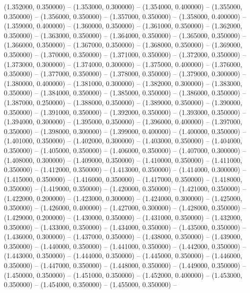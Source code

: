 (1.352000, 0.350000) -- 
(1.353000, 0.300000) -- 
(1.354000, 0.400000) -- 
(1.355000, 0.350000) -- 
(1.356000, 0.350000) -- 
(1.357000, 0.350000) -- 
(1.358000, 0.400000) -- 
(1.359000, 0.400000) -- 
(1.360000, 0.350000) -- 
(1.361000, 0.350000) -- 
(1.362000, 0.350000) -- 
(1.363000, 0.350000) -- 
(1.364000, 0.350000) -- 
(1.365000, 0.350000) -- 
(1.366000, 0.350000) -- 
(1.367000, 0.350000) -- 
(1.368000, 0.350000) -- 
(1.369000, 0.350000) -- 
(1.370000, 0.350000) -- 
(1.371000, 0.350000) -- 
(1.372000, 0.350000) -- 
(1.373000, 0.300000) -- 
(1.374000, 0.300000) -- 
(1.375000, 0.400000) -- 
(1.376000, 0.350000) -- 
(1.377000, 0.350000) -- 
(1.378000, 0.350000) -- 
(1.379000, 0.300000) -- 
(1.380000, 0.400000) -- 
(1.381000, 0.300000) -- 
(1.382000, 0.300000) -- 
(1.383000, 0.350000) -- 
(1.384000, 0.350000) -- 
(1.385000, 0.350000) -- 
(1.386000, 0.350000) -- 
(1.387000, 0.250000) -- 
(1.388000, 0.350000) -- 
(1.389000, 0.350000) -- 
(1.390000, 0.350000) -- 
(1.391000, 0.350000) -- 
(1.392000, 0.350000) -- 
(1.393000, 0.350000) -- 
(1.394000, 0.300000) -- 
(1.395000, 0.350000) -- 
(1.396000, 0.400000) -- 
(1.397000, 0.350000) -- 
(1.398000, 0.300000) -- 
(1.399000, 0.400000) -- 
(1.400000, 0.350000) -- 
(1.401000, 0.350000) -- 
(1.402000, 0.300000) -- 
(1.403000, 0.350000) -- 
(1.404000, 0.350000) -- 
(1.405000, 0.350000) -- 
(1.406000, 0.350000) -- 
(1.407000, 0.300000) -- 
(1.408000, 0.300000) -- 
(1.409000, 0.350000) -- 
(1.410000, 0.350000) -- 
(1.411000, 0.350000) -- 
(1.412000, 0.350000) -- 
(1.413000, 0.350000) -- 
(1.414000, 0.300000) -- 
(1.415000, 0.350000) -- 
(1.416000, 0.350000) -- 
(1.417000, 0.350000) -- 
(1.418000, 0.350000) -- 
(1.419000, 0.350000) -- 
(1.420000, 0.350000) -- 
(1.421000, 0.350000) -- 
(1.422000, 0.200000) -- 
(1.423000, 0.300000) -- 
(1.424000, 0.300000) -- 
(1.425000, 0.350000) -- 
(1.426000, 0.400000) -- 
(1.427000, 0.300000) -- 
(1.428000, 0.350000) -- 
(1.429000, 0.200000) -- 
(1.430000, 0.350000) -- 
(1.431000, 0.350000) -- 
(1.432000, 0.350000) -- 
(1.433000, 0.350000) -- 
(1.434000, 0.350000) -- 
(1.435000, 0.350000) -- 
(1.436000, 0.300000) -- 
(1.437000, 0.350000) -- 
(1.438000, 0.350000) -- 
(1.439000, 0.350000) -- 
(1.440000, 0.350000) -- 
(1.441000, 0.350000) -- 
(1.442000, 0.350000) -- 
(1.443000, 0.350000) -- 
(1.444000, 0.350000) -- 
(1.445000, 0.350000) -- 
(1.446000, 0.350000) -- 
(1.447000, 0.350000) -- 
(1.448000, 0.350000) -- 
(1.449000, 0.350000) -- 
(1.450000, 0.350000) -- 
(1.451000, 0.350000) -- 
(1.452000, 0.400000) -- 
(1.453000, 0.350000) -- 
(1.454000, 0.350000) -- 
(1.455000, 0.350000) -- 
